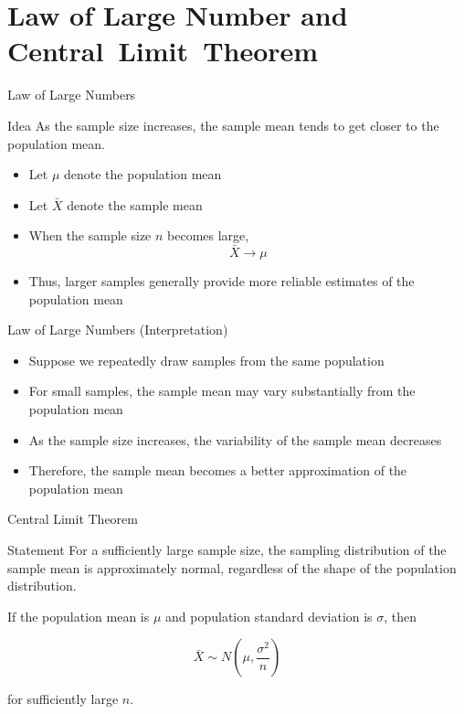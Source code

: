 \documentclass[12pt, aspectratio=169]{beamer}
\begin{document}
    \section{Law of Large Number and Central~Limit~Theorem}

    \begin{frame}{Law of Large Numbers}
        \begin{block}{Idea}
            As the sample size increases, the sample mean tends to get closer to the population mean.
        \end{block}

        \begin{itemize}
            \item Let $\mu$ denote the population mean

            \item Let $\bar{X}$ denote the sample mean

            \item When the sample size $n$ becomes large,
            \[
            \bar{X} \rightarrow \mu
            \]

            \item Thus, larger samples generally provide more reliable estimates of the population mean
        \end{itemize}
    \end{frame}


    \begin{frame}{Law of Large Numbers (Interpretation)}
        \begin{itemize}
        \item Suppose we repeatedly draw samples from the same population

        \item For small samples, the sample mean may vary substantially from the population mean

        \item As the sample size increases, the variability of the sample mean decreases

        \item Therefore, the sample mean becomes a better approximation of the population mean
        \end{itemize}
    \end{frame}


    \begin{frame}{Central Limit Theorem}
        \begin{block}{Statement}
            For a sufficiently large sample size, the sampling distribution of the sample mean is approximately normal, regardless of the shape of the population distribution.
        \end{block}

        If the population mean is $\mu$ and population standard deviation is $\sigma$, then

        \[
            \bar{X} \sim N\left(\mu,\frac{\sigma^2}{n}\right)
        \]

        for sufficiently large $n$.
    \end{frame}
\end{document}
